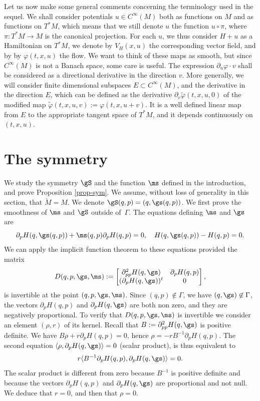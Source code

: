 Let us now make some general comments concerning the terminology used in the sequel.
We shall consider potentials $u\in C^{\infty}(M)$ both as functions on $M$ and as functions on $T^*M$, which means that we
still denote $u$ the function $u\circ \pi$, where $\pi:T^*M\to M$ is the canonical projection.
For each $u$, we thus consider $H+u$ as a Hamiltonian on $T^*M$, we denote by $V_H(x,u)$ the corresponding vector field, and by
by $\varphi(t,x,u)$ the flow. We want to think of these maps as smooth, but since $C^{\infty}(M)$ is not a Banach space, some care is useful. The expression $\partial_u \varphi \cdot v$ shall be considered as a directional
derivative in the direction $v$. More generally, we will consider finite dimensional subspaces $E\subset C^{\infty}(M)$,
and the derivative in the direction $E$, which can be defined as the derivative $\partial_v \tilde \varphi(t,x,u,0)$
of the modified map $\tilde \varphi(t,x,u,v):=\varphi(t,x,u+v)$. It is a well defined linear map from $E$ to the appropriate tangent space of $T^*M$, and it depends continuously on $(t,x,u)$.

\section{The symmetry}\label{sec-sym}

We study the symmetry $\gS$ and the function $\ms$ defined in the introduction, and prove Proposition \ref{prop-sym}.
We assume, without loss of generality in this section, that $\breve M=M$.
We denote $\gS(q,p)=(q,\gs(q,p))$.
We first prove the smoothness of $\ms$ and $\gS$ outside of~$\Gamma$. The equations defining $\ms$ and $\gs$ are
\[
\partial_pH (q, \gs(q,p))+\ms(q,p)\partial_pH(q,p)=0, \quad H(q,\gs(q,p))-H(q,p)=0.
\]
We can apply the implicit function theorem to these equations provided the matrix
\[
D(q,p,\gs,\ms):=\begin{bmatrix}
\partial^2_{pp}H(q, \gs) & \partial_pH(q, p)\\ (\partial_pH(q,\gs))^t& 0
\end{bmatrix},
\]
is invertible at the point $(q,p,\gs,\ms)$.
Since $(q,p)\not \in \Gamma$, we have $(q,\gs)\not \in \Gamma$, the vectors
$
\partial_pH(q,p)$
and
$\partial_pH(q,\gs)$
are both non zero, and they are negatively proportional.
To verify that $D(q,p,\gs, \ms)$ is invertible we consider an element
$(\rho, r)$ of its kernel. Recall that $B:= \partial^2_{pp}H(q,\gs)$ is positive definite.
We have $B\rho+r\partial_pH(q,p)=0$, hence $\rho=-rB^{-1}\partial_pH(q,p)$.
The second equation
$\langle \rho, \partial_p H(q,\gs)\rangle =0$ (scalar product),
is thus equivalent to
\[
r\langle B^{-1}\partial_pH(q,p), \partial_pH(q,\gs)\rangle =0.
\]
The scalar product is different from zero because $B^{-1}$ is positive definite and because the vectors $\partial_pH(q,p)$ and $\partial_pH(q,\gs)$ are proportional and not null. We deduce that $r=0$, and then that $\rho=0$.

